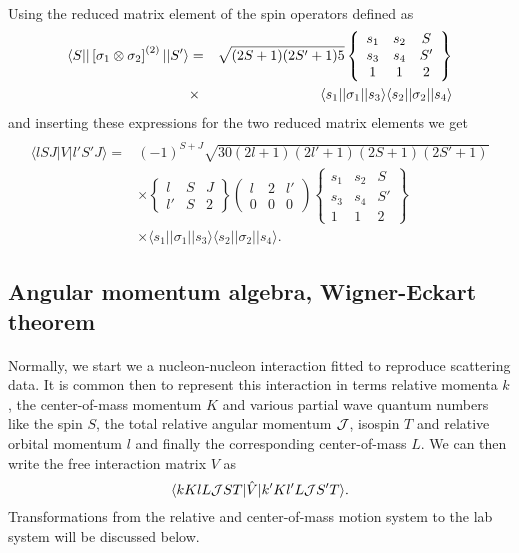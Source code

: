 \documentclass[%
twoside,                 %
final,                   %
10pt]{article}
\begin{document}
\paragraph{}
Using the  reduced matrix element of the spin 
operators defined as
\begin{eqnarray*}
\langle S\vert \vert\left[{\bf \sigma}_1 \otimes {\bf \sigma}_2\right]^{(2)} \vert \vert S' \rangle
& = & 
\sqrt{(2S+1)(2S'+1)5}
\left\{\begin{array}{ccc} s_1&s_2&S \\s_3&s_4&S' \\ 1&1&2\end{array}\right\}\\
&\times& 
\langle s_1 \vert \vert {\bf \sigma}_1 \vert \vert s_3\rangle
\langle s_2 \vert\vert {\bf \sigma}_2 \vert \vert s_4\rangle
\end{eqnarray*}
and inserting  these expressions for the two reduced matrix elements we get 
\[
\begin{array}{ll}
&\\
\langle lSJ\vert V\vert l'S'J\rangle =&(-1)^{S+J}\sqrt{30(2l+1)(2l'+1)(2S+1)(2S'+1)}\\
&\times\left\{\begin{array}{ccc}l&S &J \\l'&S&2\end{array}\right\}
\left(\begin{array}{ccc}l&2&l'\\0&0&0\end{array}\right)
\left\{\begin{array}{ccc}s_{1}&s_{2}&S\\s_{3}&s_{4}&S'\\
1&1&2\end{array}
\right\}\\
&\times\langle s_{1}\vert\vert \sigma_{1}\vert\vert s_{3}\rangle
\langle s_{2}\vert\vert \sigma_{2}\vert \vert s_{4}\rangle.
\end{array}
\]



\subsection{Angular momentum algebra, Wigner-Eckart theorem}

\paragraph{}
Normally, we start we a nucleon-nucleon interaction fitted to reproduce scattering data.
It is common then to represent this interaction in terms relative momenta $k$, the center-of-mass momentum $K$
and various partial wave quantum numbers like the spin $S$, the total relative angular  momentum ${\cal J}$, isospin $T$ and relative orbital momentum $l$ and finally the corresponding center-of-mass $L$.  
We can then write the  free interaction matrix $V$ as
\[
    \langle kKlL{\cal J}ST\vert\hat{V}\vert k'Kl'L{\cal J}S'T\rangle.
\]
Transformations from the relative and center-of-mass motion
system to the lab system will be discussed
below.
\end{document}
